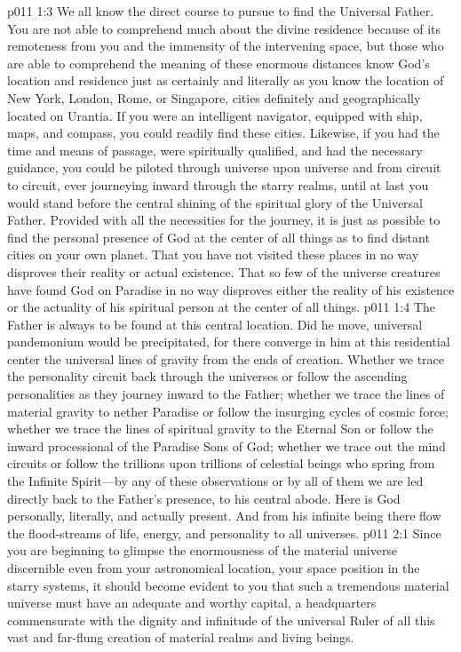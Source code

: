 \pc \vs p011 1:3 We all know the direct course to pursue to find the Universal Father. You are not able to comprehend much about the divine residence because of its remoteness from you and the immensity of the intervening space, but those who are able to comprehend the meaning of these enormous distances know God’s location and residence just as certainly and literally as you know the location of New York, London, Rome, or Singapore, cities definitely and geographically located on Urantia. If you were an intelligent navigator, equipped with ship, maps, and compass, you could readily find these cities. Likewise, if you had the time and means of passage, were spiritually qualified, and had the necessary guidance, you could be piloted through universe upon universe and from circuit to circuit, ever journeying inward through the starry realms, until at last you would stand before the central shining of the spiritual glory of the Universal Father. Provided with all the necessities for the journey, it is just as possible to find the personal presence of God at the center of all things as to find distant cities on your own planet. That you have not visited these places in no way disproves their reality or actual existence. That so few of the universe creatures have found God on Paradise in no way disproves either the reality of his existence or the actuality of his spiritual person at the center of all things.
\vs p011 1:4 The Father is always to be found at this central location. Did he move, universal pandemonium would be precipitated, for there converge in him at this residential center the universal lines of gravity from the ends of creation. Whether we trace the personality circuit back through the universes or follow the ascending personalities as they journey inward to the Father; whether we trace the lines of material gravity to nether Paradise or follow the insurging cycles of cosmic force; whether we trace the lines of spiritual gravity to the Eternal Son or follow the inward processional of the Paradise Sons of God; whether we trace out the mind circuits or follow the trillions upon trillions of celestial beings who spring from the Infinite Spirit---by any of these observations or by all of them we are led directly back to the Father’s presence, to his central abode. Here is God personally, literally, and actually present. And from his infinite being there flow the flood\hyp{}streams of life, energy, and personality to all universes.\plusone
{}
\vs p011 2:1 Since you are beginning to glimpse the enormousness of the material universe discernible even from your astronomical location, your space position in the starry systems, it should become evident to you that such a tremendous material universe must have an adequate and worthy capital, a headquarters commensurate with the dignity and infinitude of the universal Ruler of all this vast and far\hyp{}flung creation of material realms and living beings.
